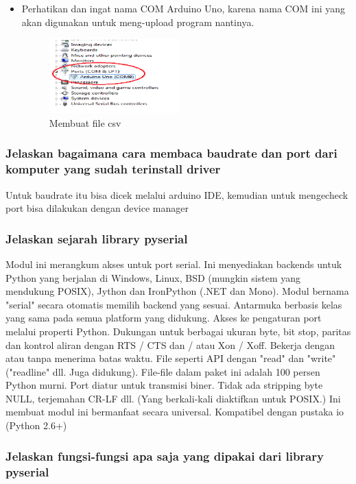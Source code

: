 \begin{enumerate}
\begin{itemize}
        \item Perhatikan dan ingat nama COM Arduino Uno, karena nama COM ini yang akan digunakan untuk meng-upload program nantinya.
        \begin{figure}[H]	
            \includegraphics[width=5cm]{figures/5/1174070/teori/11.png}
            \centering
            \caption{Membuat file csv}
        \end{figure}
        \end{itemize}
\end{enumerate}
\subsubsection{Jelaskan bagaimana cara membaca baudrate dan port dari komputer yang sudah terinstall driver}
Untuk baudrate itu bisa dicek melalui arduino IDE, kemudian untuk mengecheck port bisa dilakukan dengan device manager

\subsubsection{Jelaskan sejarah library pyserial}
Modul ini merangkum akses untuk port serial. Ini menyediakan backends untuk Python yang berjalan di Windows, Linux, BSD (mungkin sistem yang mendukung POSIX), Jython dan IronPython (.NET dan Mono). Modul bernama "serial" secara otomatis memilih backend yang sesuai. Antarmuka berbasis kelas yang sama pada semua platform yang didukung.
Akses ke pengaturan port melalui properti Python.
Dukungan untuk berbagai ukuran byte, bit stop, paritas dan kontrol aliran dengan RTS / CTS dan / atau Xon / Xoff.
Bekerja dengan atau tanpa menerima batas waktu.
File seperti API dengan "read" dan "write" ("readline" dll. Juga didukung).
File-file dalam paket ini adalah 100 persen Python murni.
Port diatur untuk transmisi biner. Tidak ada stripping byte NULL, terjemahan CR-LF dll. (Yang berkali-kali diaktifkan untuk POSIX.) Ini membuat modul ini bermanfaat secara universal.
Kompatibel dengan pustaka io (Python 2.6+)

\subsubsection{Jelaskan fungsi-fungsi apa saja yang dipakai dari library pyserial}


